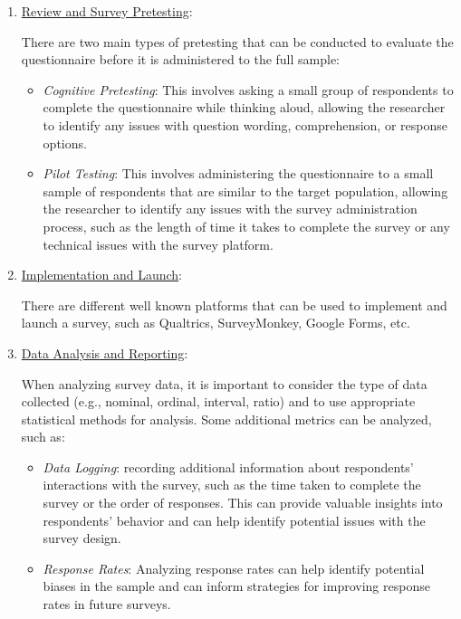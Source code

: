 \begin{enumerate}
    In addition, when designing a questionnaire, there are already existing validated questionnaires that can be used to measure certain constructs. Using these existing questionnaires can save time and effort, and can also improve the validity and reliability of the results, as these questionnaires have already been tested and validated in previous research.
    \item \ul{Review and Survey Pretesting}:
    
    There are two main types of pretesting that can be conducted to evaluate the questionnaire before it is administered to the full sample:
    \begin{itemize}
        \item \emph{Cognitive Pretesting}: This involves asking a small group of respondents to complete the questionnaire while thinking aloud, allowing the researcher to identify any issues with question wording, comprehension, or response options.
        \item \emph{Pilot Testing}: This involves administering the questionnaire to a small sample of respondents that are similar to the target population, allowing the researcher to identify any issues with the survey administration process, such as the length of time it takes to complete the survey or any technical issues with the survey platform.
    \end{itemize}
    \item \ul{Implementation and Launch}:
    
    There are different well known platforms that can be used to implement and launch a survey, such as Qualtrics, SurveyMonkey, Google Forms, etc.
    \item \ul{Data Analysis and Reporting}:
    
    When analyzing survey data, it is important to consider the type of data collected (e.g., nominal, ordinal, interval, ratio) and to use appropriate statistical methods for analysis. Some additional metrics can be analyzed, such as:
    \begin{itemize}
        \item \emph{Data Logging}: recording additional information about respondents' interactions with the survey, such as the time taken to complete the survey or the order of responses. This can provide valuable insights into respondents' behavior and can help identify potential issues with the survey design.
        \item \emph{Response Rates}: Analyzing response rates can help identify potential biases in the sample and can inform strategies for improving response rates in future surveys.
    \end{itemize}
\end{enumerate}